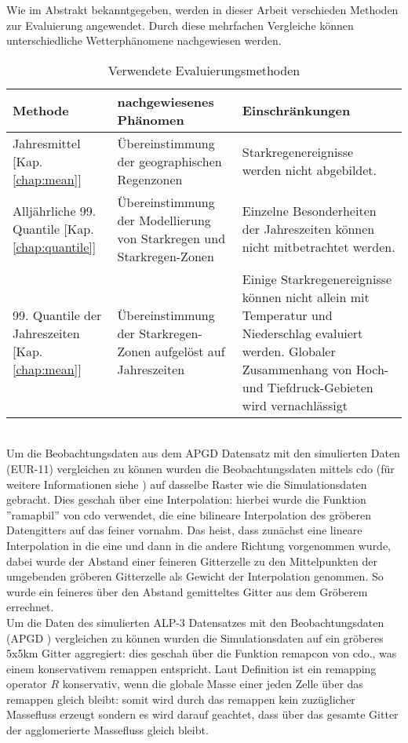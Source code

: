 Wie im Abstrakt bekanntgegeben, werden in dieser Arbeit verschieden Methoden zur Evaluierung angewendet. Durch diese mehrfachen Vergleiche können unterschiedliche Wetterphänomene nachgewiesen werden.\\

\begin{table}[h]
	\begin{tabularx}{\textwidth}{|X|X|X|}
		\hline
		\textbf{Methode} & \textbf{nachgewiesenes Phänomen}& \textbf{Einschränkungen}\\
		\hline
		Jahresmittel [Kap. \ref{chap:mean}] & Übereinstimmung der geographischen Regenzonen & Starkregenereignisse werden nicht abgebildet.\\
		\hline
		Alljährliche 99. Quantile [Kap. \ref{chap:quantile}] & Übereinstimmung der Modellierung von Starkregen und Starkregen-Zonen & Einzelne Besonderheiten der Jahreszeiten können nicht mitbetrachtet werden.\\
		\hline
		99. Quantile der Jahreszeiten [Kap. \ref{chap:mean}] & Übereinstimmung der Starkregen-Zonen aufgelöst auf Jahreszeiten & Einige Starkregenereignisse können nicht allein mit Temperatur und Niederschlag evaluiert werden. Globaler Zusammenhang von Hoch-und Tiefdruck-Gebieten wird vernachlässigt\\
		\hline
	\end{tabularx}
\caption{Verwendete Evaluierungsmethoden}
\end{table}
\hfill\\
Um die Beobachtungsdaten aus dem APGD\cite{meteoswiss} Datensatz mit den simulierten Daten (EUR-11) vergleichen zu können wurden die Beobachtungsdaten mittels cdo (für weitere Informationen siehe \cite{cdo}) auf dasselbe Raster wie die Simulationsdaten gebracht. Dies geschah über eine Interpolation: hierbei wurde die Funktion ''ramapbil'' von cdo verwendet, die eine bilineare Interpolation des gröberen Datengitters auf das feiner vornahm. Das heist, dass zunächst eine lineare Interpolation in die eine und dann in die andere Richtung vorgenommen wurde, dabei wurde der Abstand einer feineren Gitterzelle zu den Mittelpunkten der umgebenden gröberen Gitterzelle als Gewicht der Interpolation genommen. So wurde ein feineres über den Abstand gemitteltes Gitter aus dem Gröberem errechnet.\\
Um die Daten des simulierten ALP-3 Datensatzes mit den Beobachtungsdaten (APGD \cite{meteoswiss}) vergleichen zu können wurden die Simulationsdaten auf ein gröberes 5x5km Gitter aggregiert: dies geschah über die Funktion remapcon von cdo., was einem konservativem remappen entspricht. Laut Definition \cite{remapcon} ist ein remapping operator $R$ konservativ, wenn die globale Masse einer jeden Zelle über das remappen gleich bleibt: somit wird durch das remappen kein zuzüglicher Massefluss erzeugt sondern es wird darauf geachtet, dass über das gesamte Gitter der agglomerierte Massefluss gleich bleibt.